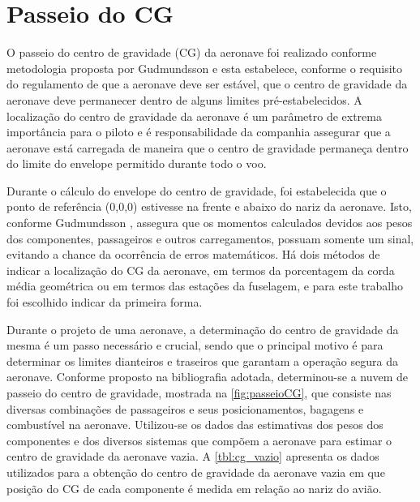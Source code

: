 \chapter{Passeio do CG}
\label{passeioCG}
O passeio do centro de gravidade (CG) da aeronave foi realizado conforme metodologia proposta por Gudmundsson \cite{gudmundsson} e esta estabelece, conforme o requisito do regulamento de que a aeronave deve ser estável, que o centro de gravidade da aeronave deve permanecer dentro de alguns limites pré-estabelecidos. A localização do centro de gravidade da aeronave é um parâmetro de extrema importância para o piloto e é responsabilidade da companhia assegurar que a aeronave está carregada de maneira que o centro de gravidade permaneça dentro do limite do envelope permitido durante todo o voo.

Durante o cálculo do envelope do centro de gravidade, foi estabelecida que o ponto de referência (0,0,0) estivesse na frente e abaixo do nariz da aeronave. Isto, conforme  Gudmundsson \cite{gudmundsson}, assegura que os momentos calculados devidos aos pesos dos componentes, passageiros e outros carregamentos, possuam somente um sinal, evitando a chance da ocorrência de erros matemáticos. Há dois métodos de indicar a localização do CG da aeronave, em termos da porcentagem da corda média geométrica ou em termos das estações da fuselagem, e para este trabalho foi escolhido indicar da primeira forma.

Durante o projeto de uma aeronave, a determinação do centro de gravidade da mesma é um passo necessário e crucial, sendo que o principal motivo é para determinar os
limites dianteiros e traseiros que garantam a operação segura da aeronave. Conforme proposto na bibliografia adotada, determinou-se a nuvem de passeio do centro de gravidade, mostrada na \autoref{fig:passeioCG}, que consiste nas diversas combinações de passageiros e seus posicionamentos, bagagens e combustível na aeronave. Utilizou-se os dados das estimativas dos pesos dos componentes e dos diversos sistemas que compõem a aeronave para estimar o centro de gravidade da aeronave vazia. A \autoref{tbl:cg_vazio} apresenta os dados utilizados para a obtenção do centro de gravidade da aeronave vazia em que posição do CG de cada componente é medida em relação ao nariz do avião.

\clearpage

